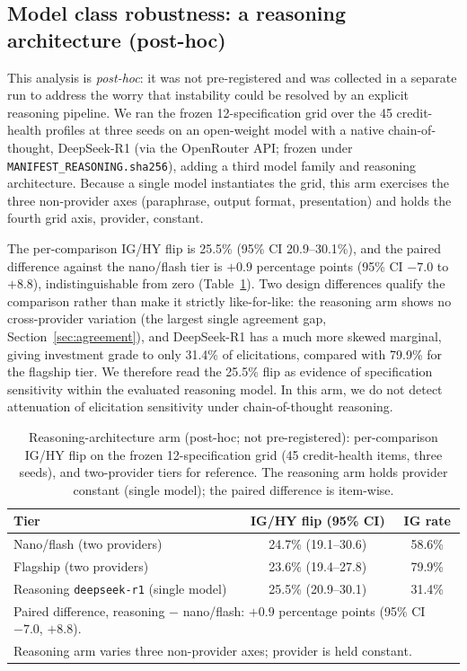 \documentclass[a4paper,fleqn]{cas-sc}
\begin{document}
\subsection{Model class robustness: a reasoning architecture (post-hoc)}\label{sec:reasoning}
This analysis is \emph{post-hoc}: it was not pre-registered and was collected in a separate run to address
the worry that instability could be resolved by an explicit reasoning pipeline. We ran the frozen
12-specification grid over the 45 credit-health profiles at three seeds on an open-weight model with a
native chain-of-thought, DeepSeek-R1 (via the OpenRouter API; frozen under
\texttt{MANIFEST\_REASONING.sha256}), adding a third model family and reasoning architecture. Because a
single model instantiates the grid, this arm exercises the three non-provider axes (paraphrase, output
format, presentation) and holds the fourth grid axis, provider, constant.

The per-comparison IG/HY flip is 25.5\% (95\% CI 20.9--30.1\%), and the paired difference against the
nano/flash tier is $+0.9$ percentage points (95\% CI $-7.0$ to $+8.8$), indistinguishable from zero
(Table~\ref{tab:reason}). Two design differences qualify the comparison rather than make it strictly
like-for-like: the reasoning arm shows no cross-provider variation (the largest single agreement gap,
Section~\ref{sec:agreement}), and DeepSeek-R1 has a much more skewed marginal, giving
investment grade to only 31.4\% of elicitations, compared with 79.9\% for the flagship tier. We therefore read
the 25.5\% flip as evidence of specification sensitivity within the evaluated reasoning model. In this arm,
we do not detect attenuation of elicitation sensitivity under chain-of-thought reasoning.

\begin{table}[t]\centering
\caption{Reasoning-architecture arm (post-hoc; not pre-registered): per-comparison IG/HY flip on the
frozen 12-specification grid (45 credit-health items, three seeds), and two-provider tiers for
reference. The reasoning arm holds provider constant (single model); the paired difference is item-wise.}
\label{tab:reason}
\begin{tabular}{lcc}\toprule
Tier & IG/HY flip (95\% CI) & IG rate \\\midrule
Nano/flash (two providers) & 24.7\% (19.1--30.6) & 58.6\% \\
Flagship (two providers) & 23.6\% (19.4--27.8) & 79.9\% \\
Reasoning \texttt{deepseek-r1} (single model) & 25.5\% (20.9--30.1) & 31.4\% \\\midrule
\multicolumn{3}{l}{Paired difference, reasoning $-$ nano/flash: $+0.9$ percentage points (95\% CI $-7.0$, $+8.8$).}\\
\multicolumn{3}{l}{Reasoning arm varies three non-provider axes; provider is held constant.}\\\bottomrule
\end{tabular}\end{table}
\end{document}
